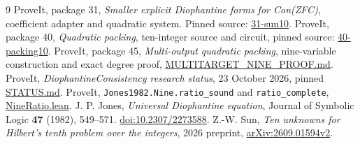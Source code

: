 \documentclass[11pt]{article}
\theoremstyle{definition}\newtheorem{definition}[theorem]{Definition}
\newcommand{\base}{https://github.com/VladimirReshetnikov/ProveIt/blob/124c07c0b77a9e20e84676514d8b1ff78536ea3f/Computability/DiophantineConsistency}
\begin{document}
\appendix
{}

\clearpage


\begin{thebibliography}{9}\small
{} ProveIt, package 31, \emph{Smaller explicit Diophantine
forms for Con(ZFC)}, coefficient adapter and quadratic system.
Pinned source: \href{\base/con-zfc-diophantine-forms/31-sun10/README.md}{31-sun10}.
 ProveIt, package 40, \emph{Quadratic packing},
ten-integer source and circuit, pinned source:
\href{\base/con-zfc-diophantine-forms/40-packing10/README.md}{40-packing10}.
 ProveIt, package 45, \emph{Multi-output quadratic
packing}, nine-variable construction and exact degree proof,
\href{\base/con-zfc-diophantine-forms/45-multioutput/nine/MULTITARGET_NINE_PROOF.md}{MULTITARGET\_NINE\_PROOF.md}.
 ProveIt, \emph{DiophantineConsistency research status},
23 October 2026, pinned \href{\base/STATUS.md}{STATUS.md}.
 ProveIt, \texttt{Jones1982.Nine.ratio\_sound} and
\texttt{ratio\_complete},
\href{https://github.com/VladimirReshetnikov/ProveIt/blob/124c07c0b77a9e20e84676514d8b1ff78536ea3f/Computability/HilbertTenthProblem/Lean/Diophantine/Paper1982/NineRatio.lean}{NineRatio.lean}.
 J. P. Jones, \emph{Universal Diophantine equation},
Journal of Symbolic Logic \textbf{47} (1982), 549--571.
\href{https://doi.org/10.2307/2273588}{doi:10.2307/2273588}.
 Z.-W. Sun, \emph{Ten unknowns for Hilbert's tenth
problem over the integers}, 2026 preprint,
\href{https://arxiv.org/abs/2609.01594v2}{arXiv:2609.01594v2}.
\end{thebibliography}
\end{document}
